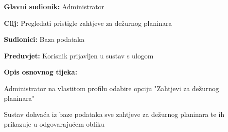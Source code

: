 			\noindent {}
		\begin{packed_item}
			
			\item \textbf{Glavni sudionik: }$ $Administrator$ $
			\item  \textbf{Cilj:} $ $Pregledati pristigle zahtjeve za dežurnog planinara$ $
			\item  \textbf{Sudionici:} $ $Baza podataka$ $
			\item  \textbf{Preduvjet:} $ $Korisnik prijavljen u sustav s ulogom  $ $
			\item  \textbf{Opis osnovnog tijeka:}
			
			\item[] \begin{packed_enum}
				
				\item $ $Administrator na vlastitom profilu odabire opciju "Zahtjevi za dežurnog planinara"$ $
				\item $ $Sustav dohvaća iz baze podataka sve zahtjeve za dežurnog planinara te ih prikazuje u odgovarajućem obliku$ $
			\end{packed_enum}
		\end{packed_item}
		
